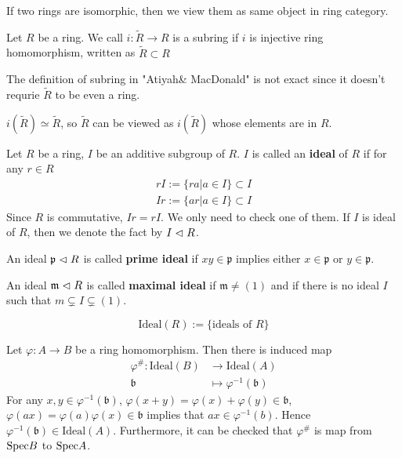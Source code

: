 \documentclass{amsart}
\begin{document}
If two rings are isomorphic, then we view them as same object in ring category.
\begin{secdefn}
Let $R$ be a ring. We call $i:\tilde{R}  \rightarrow R$ is a subring if $i$ is injective ring homomorphism, written as $\tilde{R} \subset R$
\end{secdefn}
\begin{rem}
	The definition of subring in "Atiyah\& MacDonald" is not exact since it doesn't requrie $\tilde{R}$ to be even a ring.
\end{rem}

\begin{rem}
	$i(\tilde{R}) \simeq \tilde{R}$, so $\tilde{R}$ can be viewed as $i(\tilde{R})$ whose elements are in $R$.
\end{rem}
\begin{secdefn}
	Let $R$ be a ring, $I$ be an additive subgroup of $R$. $I$ is called an \textbf{ideal} of $R$ if for any $r \in R$
\[
\begin{aligned}
&rI := \{ ra| a \in I \} \subset I&\\
&Ir := \{ ar| a \in I \} \subset I&
\end{aligned}
\]
Since $R$ is commutative, $Ir = rI$. We only need to check one of them. If $I$ is ideal of $R$, then we denote the fact by $I \vartriangleleft R$.

An ideal $\mathfrak{p} \vartriangleleft R$ is called \textbf{prime ideal} if $xy \in \mathfrak{p}$ implies either $x \in \mathfrak{p}$ or $ y \in \mathfrak{p}$.

An ideal $\mathfrak{m} \vartriangleleft R$ is called \textbf{maximal ideal} if $\mathfrak{m} \neq (1)$ and if there is no ideal $I$ such that $m \subsetneq I \subsetneq (1)$.
\end{secdefn}

\[
\text{Ideal}(R):= \bigl\{ \text{ideals of } R\bigr\}
\]

Let $\varphi: A \rightarrow B$ be a ring homomorphism. Then there is induced map
\[
\begin{aligned}
\varphi^{\#}: \text{Ideal}(B) &\rightarrow \text{Ideal}(A)\\
\mathfrak{b} &\mapsto \varphi^{-1}(\mathfrak{b})
\end{aligned}
\] 
For any $x,y \in \varphi^{-1}(\mathfrak{b})$, $\varphi(x+y)= \varphi(x) + \varphi(y) \in \mathfrak{b}$, $\varphi(ax)= \varphi(a)\varphi(x) \in \mathfrak{b}$ implies that $ax \in \varphi^{-1}(b)$. Hence $\varphi^{-1}(\mathfrak{b}) \in \text{Ideal}(A)$. Furthermore, it can be checked that $\varphi^{\#}$ is map from $\text{Spec} B$ to $\text{Spec} A$.
\end{document}
